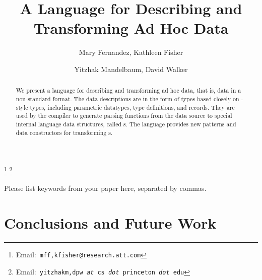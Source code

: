 \documentclass{entcs}
\begin{document}
\begin{frontmatter}
  \title{A Language for Describing and Transforming Ad Hoc Data} 
  \author{Mary Fernandez,
    Kathleen Fisher}
  \address{AT\&T\\ 
    Florham Park,NJ USA} 
  \author{Yitzhak Mandelbaum,
    David Walker}
  \address{Department of Computer Science\\ 
    Princeton University\\
    Princeton,NJ USA} 
  \thanks[attemail]{Email:\texttt{\normalshape
        mff,kfisher@research.att.com}}
  \thanks[premail]{Email:\texttt{\normalshape
        yitzhakm,dpw {\it at} cs {\it dot} princeton {\it dot} edu}}
\begin{abstract} 
  We present a language for describing and transforming ad hoc data,
  that is, data in a non-standard format. The data descriptions are in
  the form of types based closely on \ml{}-style types, including
  parametric datatypes, type definitions, and records. They are used
  by the compiler to generate parsing functions from the data source
  to special internal language data structures, called \pvalue{}s.
  The language provides new patterns and data constructors for 
  transforming \pvalue{}s.
\end{abstract}
\begin{keyword}
  Please list keywords from your paper here, separated by commas.
\end{keyword}
\end{frontmatter}











\section{Conclusions and Future Work}
\label{sec:conclusion}



\end{document}
